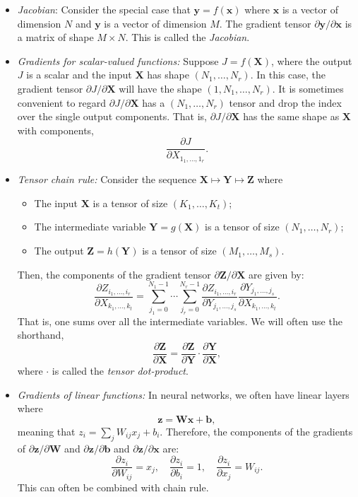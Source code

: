 \documentclass[11pt]{article}
\def\beq{\begin{equation}}
\def\eeq{\end{equation}}
\newcommand{\bbf}{\mathbf{b}}
\newcommand{\xbf}{\mathbf{x}}
\newcommand{\ybf}{\mathbf{y}}
\newcommand{\zbf}{\mathbf{z}}
\newcommand{\Wbf}{\mathbf{W}}
\newcommand{\Xbf}{\mathbf{X}}
\newcommand{\Ybf}{\mathbf{Y}}
\newcommand{\Zbf}{\mathbf{Z}}
\begin{document}
\begin{itemize}
\item \emph{Jacobian}: Consider the special case that $\ybf = f(\xbf)$ where
$\xbf$ is a vector of dimension $N$ and $\ybf$ is a vector of dimension $M$.
The gradient tensor $\partial \ybf/\partial \xbf$ is a matrix of shape $M \times N$.
This is called the \emph{Jacobian}.

\item \emph{Gradients for scalar-valued functions:}  Suppose $J = f(\Xbf)$,
where the output $J$ is a scalar and the input $\Xbf$ has shape $(N_1,\ldots,N_r)$.
In this case, the gradient tensor $\partial J/\partial \Xbf$ will have the shape
$(1,N_1,\ldots,N_r)$.  It is sometimes convenient to regard $\partial J/\partial \Xbf$ has a
$(N_1,\ldots,N_r)$ tensor and drop the index over the single output components.  That is,
$\partial J/\partial \Xbf$ has the same shape as $\Xbf$ with components,
\[
    \frac{\partial J}{\partial X_{1_1,\ldots,1_r}}.
\]

\item \emph{Tensor chain rule:}
Consider the sequence $\Xbf \mapsto \Ybf \mapsto \Zbf$ where
\begin{itemize}
  \item The input $\Xbf$ is a tensor of size $(K_1,\ldots,K_t)$;
  \item The intermediate variable $\Ybf=g(\Xbf)$ is a tensor of size $(N_1,\ldots,N_r)$;
  \item The output $\Zbf=h(\Ybf)$ is a tensor of size $(M_1,\ldots,M_s)$.
\end{itemize}
Then, the components of the gradient tensor $\partial \Zbf/\partial \Xbf$ are given by:
\[
    \frac{\partial Z_{i_1,\ldots,i_r}}{\partial X_{k_1,\ldots,k_t}}
    = \sum_{j_1=0}^{N_1-1}\cdots \sum_{j_r=0}^{N_r-1} \frac{\partial Z_{i_1,\ldots,i_r}}{\partial Y_{j_1,\ldots,j_s}}
    \frac{\partial Y_{j_1,\ldots,j_s}}{\partial X_{k_1,\ldots,k_t}}.
\]
That is, one sums over all the intermediate variables.  We will often use the shorthand,
\[
    \frac{\partial \Zbf}{\partial \Xbf} = \frac{\partial \Zbf}{\partial \Ybf}\cdot \frac{\partial \Ybf}{\partial \Xbf},
\]
where $\cdot$ is called the \emph{tensor dot-product}.



\item \emph{Gradients of linear functions:}  In neural networks, we often
have linear layers where
\[
    \zbf = \Wbf \xbf + \bbf,
\]
meaning that $z_i = \sum_j W_{ij}x_j + b_i$.
Therefore, the components of the gradients of $\partial \zbf/\partial \Wbf$ and $\partial \zbf/\partial \bbf$ and
$\partial \zbf/\partial \xbf$ are:
\beq \label{eq:gradlinvec}
    \frac{\partial z_i}{\partial W_{ij}}=x_j, \quad
    \frac{\partial z_i}{\partial b_i}=1, \quad
    \frac{\partial z_i}{\partial x_j}=W_{ij}.
\eeq
This can often be combined with chain rule.

\end{itemize}
\end{document}

